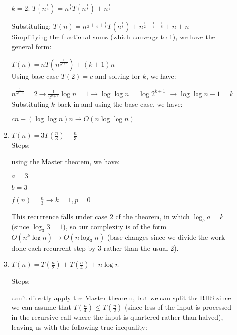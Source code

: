 \documentclass[12pt]{article}
\begin{document}
\begin{enumerate}
\begin{enumerate}
        $k = 2$: $T(n^\frac{1}{4}) = n^\frac{1}{8}T(n^\frac{1}{8}) + n^\frac{1}{4}$

        Substituting: $T(n) = n^{\frac{1}{2} + \frac{1}{4} + \frac{1}{8}}T(n^\frac{1}{8}) + n^{\frac{1}{2} + \frac{1}{4} + \frac{1}{8}} + n + n$\\

        Simplifiying the fractional sums (which converge to 1), we have the general form:

        $T(n) = nT(n^\frac{1}{2^{k + 1}}) + (k + 1)n$\\

        Using base case $T(2) = c$ and solving for $k$, we have:

        $n^\frac{1}{2^{k + 1}} = 2 \longrightarrow \frac{1}{2^{k + 1}}\log n = 1 \longrightarrow \log\log n = \log2^{k + 1}$
        $\longrightarrow \log\log n - 1 = k$\\

        Substituting $k$ back in and using the base case, we have:

        $cn + (\log\log n)n \longrightarrow O(n\log\log n)$\\
        
        \item $T(n) = 3T(\frac{n}{3}) + \frac{n}{3}$ \\
        
        Steps:
        
        using the Master theorem, we have:
        
        $a = 3$
        
        $b = 3$
        
        $f(n) = \frac{n}{3} \longrightarrow k = 1, p = 0$
        
        This recurrence falls under case 2 of the theorem, in which $\log_{b}{a} = k$ (since $\log_{3}{3} = 1$), so our 
        complexity is of the form $O(n^k \log n) \longrightarrow O(n\log_{3}{n})$ (base changes since we divide the work 
        done each recurrent step by 3 rather than the usual 2).\\
        
        \item $T(n) = T(\frac{n}{2}) + T(\frac{n}{4}) + n\log n$
        
        Steps:

        can't directly apply the Master theorem, but we can split the RHS since we can assume that $T(\frac{n}{4}) \leq T(\frac{n}{2})$ 
        (since less of the input is processed in the recursive call where the input is quartered rather than  halved), 
        leaving us with the following true inequality:


\end{enumerate}
\end{enumerate}
\end{document}
